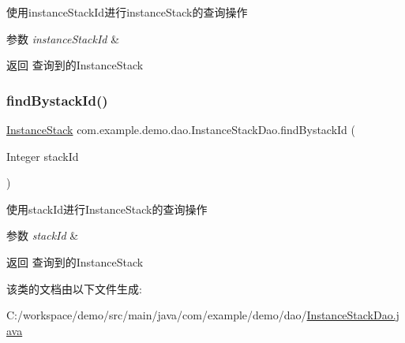 使用instance\+Stack\+Id进行instance\+Stack的查询操作 
\begin{DoxyParams}{参数}
{\em instance\+Stack\+Id} & \\
\hline
\end{DoxyParams}
\begin{DoxyReturn}{返回}
查询到的\+Instance\+Stack 
\end{DoxyReturn}
\mbox{\label{interfacecom_1_1example_1_1demo_1_1dao_1_1_instance_stack_dao_a1b64ca77ec2f8416bdd01a3ea2bc898b}} 
\subsubsection{\texorpdfstring{find\+Bystack\+Id()}{findBystackId()}}
{\footnotesize\ttfamily \mbox{\hyperlink{classcom_1_1example_1_1demo_1_1modular_1_1_instance_stack}{Instance\+Stack}} com.\+example.\+demo.\+dao.\+Instance\+Stack\+Dao.\+find\+Bystack\+Id (\begin{DoxyParamCaption}\item[{Integer}]{stack\+Id }\end{DoxyParamCaption})}

使用stack\+Id进行\+Instance\+Stack的查询操作 
\begin{DoxyParams}{参数}
{\em stack\+Id} & \\
\hline
\end{DoxyParams}
\begin{DoxyReturn}{返回}
查询到的\+Instance\+Stack 
\end{DoxyReturn}


该类的文档由以下文件生成\+:\begin{DoxyCompactItemize}
\item 
C\+:/workspace/demo/src/main/java/com/example/demo/dao/\mbox{\hyperlink{_instance_stack_dao_8java}{Instance\+Stack\+Dao.\+java}}\end{DoxyCompactItemize}
